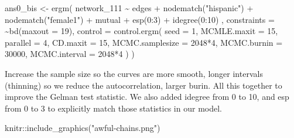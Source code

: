 \documentclass[
]{book}
\newenvironment{Shaded}{\begin{snugshade}}{\end{snugshade}}
\newcommand{\AttributeTok}[1]{\textcolor[rgb]{0.77,0.63,0.00}{#1}}
\newcommand{\DecValTok}[1]{\textcolor[rgb]{0.00,0.00,0.81}{#1}}
\newcommand{\FunctionTok}[1]{\textcolor[rgb]{0.00,0.00,0.00}{#1}}
\newcommand{\NormalTok}[1]{#1}
\newcommand{\OtherTok}[1]{\textcolor[rgb]{0.56,0.35,0.01}{#1}}
\newcommand{\SpecialCharTok}[1]{\textcolor[rgb]{0.00,0.00,0.00}{#1}}
\newcommand{\StringTok}[1]{\textcolor[rgb]{0.31,0.60,0.02}{#1}}
\begin{document}
\begin{Shaded}
\begin{Highlighting}[]
\NormalTok{ans0\_bis }\OtherTok{\textless{}{-}} \FunctionTok{ergm}\NormalTok{(}
\NormalTok{  network\_111 }\SpecialCharTok{\textasciitilde{}}
\NormalTok{    edges }\SpecialCharTok{+}
    \FunctionTok{nodematch}\NormalTok{(}\StringTok{"hispanic"}\NormalTok{) }\SpecialCharTok{+}
    \FunctionTok{nodematch}\NormalTok{(}\StringTok{"female1"}\NormalTok{) }\SpecialCharTok{+}
\NormalTok{    mutual }\SpecialCharTok{+} 
    \FunctionTok{esp}\NormalTok{(}\DecValTok{0}\SpecialCharTok{:}\DecValTok{3}\NormalTok{) }\SpecialCharTok{+} 
    \FunctionTok{idegree}\NormalTok{(}\DecValTok{0}\SpecialCharTok{:}\DecValTok{10}\NormalTok{)}
\NormalTok{    ,}
  \AttributeTok{constraints =} \SpecialCharTok{\textasciitilde{}}\FunctionTok{bd}\NormalTok{(}\AttributeTok{maxout =} \DecValTok{19}\NormalTok{),}
  \AttributeTok{control =} \FunctionTok{control.ergm}\NormalTok{(}
    \AttributeTok{seed        =} \DecValTok{1}\NormalTok{,}
    \AttributeTok{MCMLE.maxit =} \DecValTok{15}\NormalTok{,}
    \AttributeTok{parallel    =} \DecValTok{4}\NormalTok{,}
    \AttributeTok{CD.maxit    =} \DecValTok{15}\NormalTok{,}
    \AttributeTok{MCMC.samplesize =} \DecValTok{2048}\SpecialCharTok{*}\DecValTok{4}\NormalTok{,}
    \AttributeTok{MCMC.burnin =} \DecValTok{30000}\NormalTok{,}
    \AttributeTok{MCMC.interval =} \DecValTok{2048}\SpecialCharTok{*}\DecValTok{4}
\NormalTok{    )}
\NormalTok{  )}
\end{Highlighting}
\end{Shaded}

Increase the sample size so the curves are more smooth, longer intervals (thinning) so we reduce the autocorrelation, larger burin. All this together to improve the Gelman test statistic. We also added idegree from 0 to 10, and esp from 0 to 3 to explicitly match those statistics in our model.

\begin{Shaded}
\begin{Highlighting}[]
\NormalTok{knitr}\SpecialCharTok{::}\FunctionTok{include\_graphics}\NormalTok{(}\StringTok{"awful{-}chains.png"}\NormalTok{)}
\end{Highlighting}
\end{Shaded}
\end{document}
